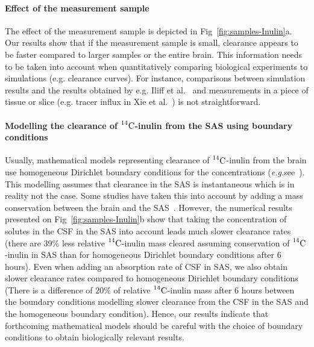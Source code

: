 \documentclass[10pt]{article}
\newcommand{\eg}{\emph{e.g.}\;}
\newcommand{\1}{^{(1)}}
\newcommand{\2}{^{(2)}}
\newcommand{\Cinulin}{$\prescript{14}{}{\text{C}}$-inulin }
\begin{document}
\paragraph{Effect of the measurement sample}
The effect of the measurement sample is depicted in Fig~\ref{fig:samples-Inulin}a. Our results show that if the measurement sample is small, clearance appears to be faster compared to larger samples or the entire brain. This information needs to be taken into account when quantitatively comparing biological experiments to simulations (e.g. clearance curves). For instance, comparisons between simulation results and the results obtained by e.g. Iliff et al.~\cite{Iliff_2012_PVS} and measurements in a piece of tissue or slice (e.g. tracer influx in Xie et al.~\cite{Xie_2013_sleep}) is not straightforward. 

\paragraph{Modelling the clearance of \Cinulin from the SAS using boundary conditions}
Usually, mathematical models representing clearance of \Cinulin from the brain use homogeneous Dirichlet boundary conditions for the concentrations (\eg see~\cite{Holter9894,stoverud_modeling_2012}). This modelling assumes that clearance in the SAS is instantaneous which is in reality not the case. Some studies have taken this into account by adding a mass conservation between the brain and the SAS~\cite{croci2019uncertainty}.
However, the numerical results presented on Fig~\ref{fig:samples-Inulin}b show that taking the concentration of solutes in the CSF in the SAS into account leads much slower clearance rates (there are 39\% less relative \Cinulin mass cleared assuming conservation of \Cinulin in SAS than for homogeneous Dirichlet boundary conditions after 6 hours). Even when adding an absorption rate of CSF in SAS, we also obtain slower clearance rates compared to homogeneous Dirichlet boundary conditions (There is a difference of 20\% of relative \Cinulin mass after 6 hours between the boundary conditions modelling slower clearance from the CSF in the SAS and the homogeneous boundary condition). Hence, our results indicate that forthcoming mathematical models should be careful with the choice of boundary conditions to obtain biologically relevant results.

\end{document}
